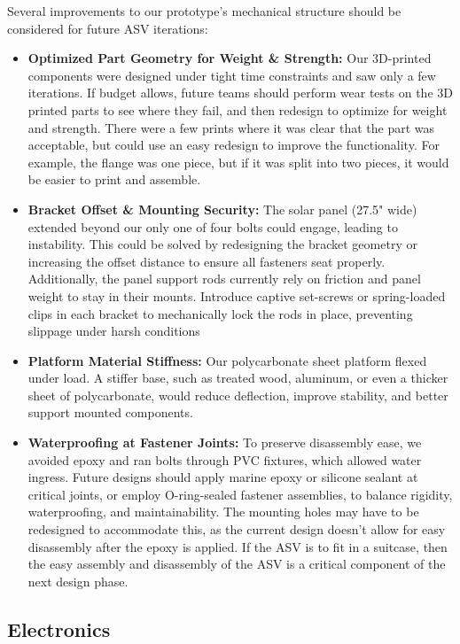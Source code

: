 Several improvements to our prototype's mechanical structure should be considered for future ASV iterations:
\begin{itemize}
  \item \textbf{Optimized Part Geometry for Weight \& Strength:}  
    Our 3D-printed components were designed under tight time constraints and saw only a few iterations. If budget allows, future teams should perform wear tests on the 3D printed parts to see where they fail, and then redesign to optimize for weight and strength. There were a few prints where it was clear that the part was acceptable, but could use an easy redesign to improve the functionality. For example, the flange was one piece, but if it was split into two pieces, it would be easier to print and assemble.
  \item \textbf{Bracket Offset \& Mounting Security:}  
    The solar panel (27.5" wide) extended beyond our only one of four bolts could engage, leading to instability. This could be solved by redesigning the bracket geometry or increasing the offset distance to ensure all fasteners seat properly. Additionally, the panel support rods currently rely on friction and panel weight to stay in their mounts. Introduce captive set-screws or spring-loaded clips in each bracket to mechanically lock the rods in place, preventing slippage under harsh conditions    
  \item \textbf{Platform Material Stiffness:}  
    Our polycarbonate sheet platform flexed under load. A stiffer base, such as treated wood, aluminum, or even a thicker sheet of polycarbonate, would reduce deflection, improve stability, and better support mounted components.
  \item \textbf{Waterproofing at Fastener Joints:}  
    To preserve disassembly ease, we avoided epoxy and ran bolts through PVC fixtures, which allowed water ingress. Future designs should apply marine epoxy or silicone sealant at critical joints, or employ O-ring-sealed fastener assemblies, to balance rigidity, waterproofing, and maintainability. The mounting holes may have to be redesigned to accommodate this, as the current design doesn't allow for easy disassembly after the epoxy is applied. If the ASV is to fit in a suitcase, then the easy assembly and disassembly of the ASV is a critical component of the next design phase. 
\end{itemize}

\subsection{Electronics}

